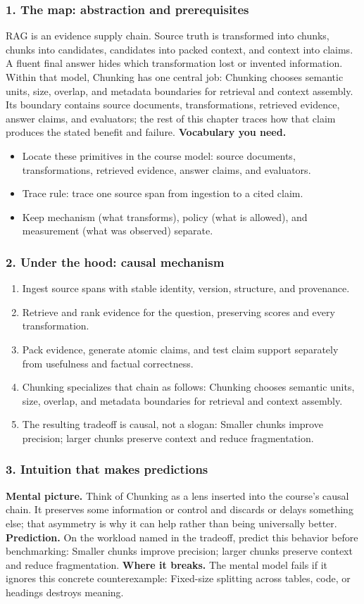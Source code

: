 \subsubsection*{1. The map: abstraction and prerequisites}
RAG is an evidence supply chain. Source truth is transformed into chunks, chunks into candidates, candidates into packed context, and context into claims. A fluent final answer hides which transformation lost or invented information.
Within that model, Chunking has one central job: Chunking chooses semantic units, size, overlap, and metadata boundaries for retrieval and context assembly. Its boundary contains source documents, transformations, retrieved evidence, answer claims, and evaluators; the rest of this chapter traces how that claim produces the stated benefit and failure.
\textbf{Vocabulary you need.}\begin{itemize}
\item Locate these primitives in the course model: source documents, transformations, retrieved evidence, answer claims, and evaluators.
\item Trace rule: trace one source span from ingestion to a cited claim.
\item Keep mechanism (what transforms), policy (what is allowed), and measurement (what was observed) separate.
\end{itemize}
\subsubsection*{2. Under the hood: causal mechanism}\begin{enumerate}
\item Ingest source spans with stable identity, version, structure, and provenance.
\item Retrieve and rank evidence for the question, preserving scores and every transformation.
\item Pack evidence, generate atomic claims, and test claim support separately from usefulness and factual correctness.
\item Chunking specializes that chain as follows: Chunking chooses semantic units, size, overlap, and metadata boundaries for retrieval and context assembly.
\item The resulting tradeoff is causal, not a slogan: Smaller chunks improve precision; larger chunks preserve context and reduce fragmentation.
\end{enumerate}
\subsubsection*{3. Intuition that makes predictions}
\textbf{Mental picture.} Think of Chunking as a lens inserted into the course's causal chain. It preserves some information or control and discards or delays something else; that asymmetry is why it can help rather than being universally better.
\textbf{Prediction.} On the workload named in the tradeoff, predict this behavior before benchmarking: Smaller chunks improve precision; larger chunks preserve context and reduce fragmentation.
\textbf{Where it breaks.} The mental model fails if it ignores this concrete counterexample: Fixed-size splitting across tables, code, or headings destroys meaning.
